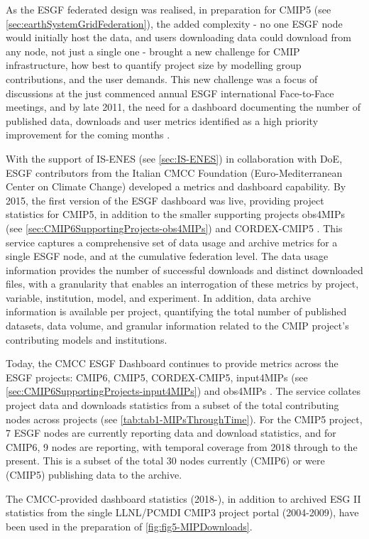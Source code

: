 \documentclass[manuscript]{copernicus}
\begin{document}
As the ESGF federated design was realised, in preparation for CMIP5 (see \autoref{sec:earthSystemGridFederation}), the added complexity - no one ESGF node would initially host the data, and users downloading data could download from any node, not just a single one - brought a new challenge for CMIP infrastructure, how best to quantify project size by modelling group contributions, and the user demands. This new challenge was a focus of discussions at the just commenced annual ESGF international Face-to-Face meetings, and by late 2011, the need for a dashboard documenting the number of published data, downloads and user metrics identified as a high priority improvement for the coming months \citep{williams_doe_2011}.

With the support of IS-ENES (see \autoref{sec:IS-ENES}) in collaboration with DoE, ESGF contributors from the Italian CMCC Foundation (Euro-Mediterranean Center on Climate Change) developed a metrics and dashboard capability. By 2015, the first version of the ESGF dashboard was live, providing project statistics for CMIP5, in addition to the smaller supporting projects obs4MIPs (see \autoref{sec:CMIP6SupportingProjects-obs4MIPs}) and CORDEX-CMIP5 \citep{williams_5th_2016}. This service captures a comprehensive set of data usage and archive metrics for a single ESGF node, and at the cumulative federation level. The data usage information provides the number of successful downloads and distinct downloaded files, with a granularity that enables an interrogation of these metrics by project, variable, institution, model, and experiment. In addition, data archive information is available per project, quantifying the total number of published datasets, data volume, and granular information related to the CMIP project's contributing models and institutions.

Today, the CMCC ESGF Dashboard continues to provide metrics across the ESGF projects: CMIP6, CMIP5, CORDEX-CMIP5, input4MIPs (see \autoref{sec:CMIP6SupportingProjects-input4MIPs}) and obs4MIPs \citep{fiore_climate_2019}. The service collates project data and downloads statistics from a subset of the total contributing nodes across projects (see \autoref{tab:tab1-MIPsThroughTime}). For the CMIP5 project, 7 ESGF nodes are currently reporting data and download statistics, and for CMIP6, 9 nodes are reporting, with temporal coverage from 2018 through to the present. This is a subset of the total 30 nodes currently (CMIP6) or were (CMIP5) publishing data to the archive.

The CMCC-provided dashboard statistics (2018-), in addition to archived ESG II statistics from the single LLNL/PCMDI CMIP3 project portal (2004-2009), have been used in the preparation of \autoref{fig:fig5-MIPDownloads}.
\end{document}
